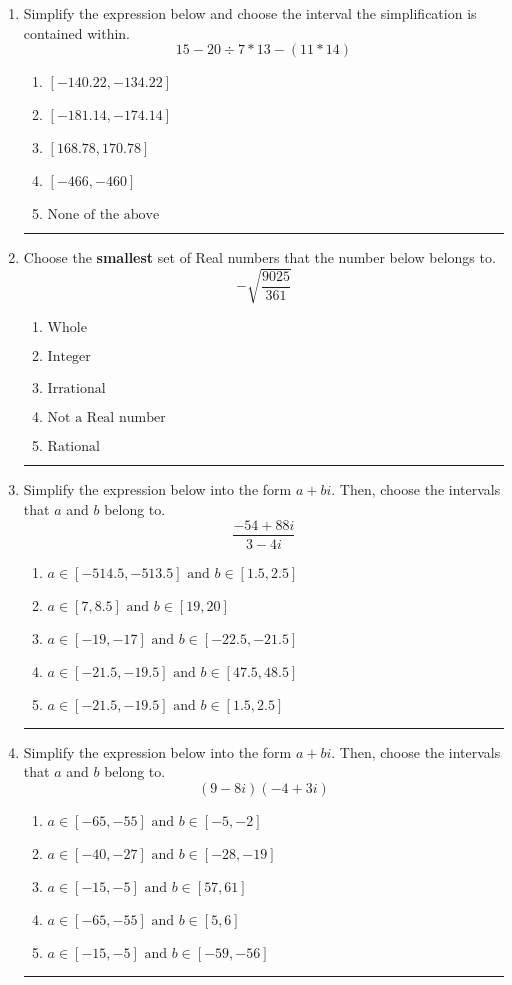 \documentclass[14pt]{extbook}
\newcommand{\litem}[1]{\item#1\hspace*{-1cm}\rule{\textwidth}{0.4pt}}
\begin{document}
\begin{enumerate}
\litem{
Simplify the expression below and choose the interval the simplification is contained within.\[ 15 - 20 \div 7 * 13 - (11 * 14) \]\begin{enumerate}[label=\Alph*.]
\item \( [-140.22, -134.22] \)
\item \( [-181.14, -174.14] \)
\item \( [168.78, 170.78] \)
\item \( [-466, -460] \)
\item \( \text{None of the above} \)

\end{enumerate} }
\litem{
Choose the \textbf{smallest} set of Real numbers that the number below belongs to.\[ -\sqrt{\frac{9025}{361}} \]\begin{enumerate}[label=\Alph*.]
\item \( \text{Whole} \)
\item \( \text{Integer} \)
\item \( \text{Irrational} \)
\item \( \text{Not a Real number} \)
\item \( \text{Rational} \)

\end{enumerate} }
\litem{
Simplify the expression below into the form $a+bi$. Then, choose the intervals that $a$ and $b$ belong to.\[ \frac{-54 + 88 i}{3 - 4 i} \]\begin{enumerate}[label=\Alph*.]
\item \( a \in [-514.5, -513.5] \text{ and } b \in [1.5, 2.5] \)
\item \( a \in [7, 8.5] \text{ and } b \in [19, 20] \)
\item \( a \in [-19, -17] \text{ and } b \in [-22.5, -21.5] \)
\item \( a \in [-21.5, -19.5] \text{ and } b \in [47.5, 48.5] \)
\item \( a \in [-21.5, -19.5] \text{ and } b \in [1.5, 2.5] \)

\end{enumerate} }
\litem{
Simplify the expression below into the form $a+bi$. Then, choose the intervals that $a$ and $b$ belong to.\[ (9 - 8 i)(-4 + 3 i) \]\begin{enumerate}[label=\Alph*.]
\item \( a \in [-65, -55] \text{ and } b \in [-5, -2] \)
\item \( a \in [-40, -27] \text{ and } b \in [-28, -19] \)
\item \( a \in [-15, -5] \text{ and } b \in [57, 61] \)
\item \( a \in [-65, -55] \text{ and } b \in [5, 6] \)
\item \( a \in [-15, -5] \text{ and } b \in [-59, -56] \)


\end{enumerate}}
\end{enumerate}
\end{document}
